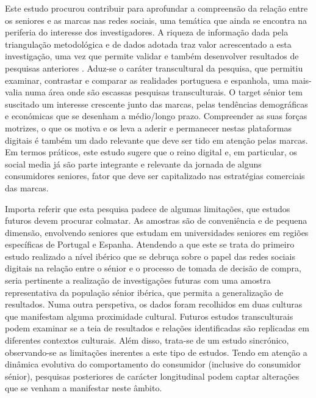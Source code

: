 \documentclass[portuguese]{textolivre}
\begin{document}
Este estudo procurou contribuir para aprofundar a compreensão da relação entre os seniores e as marcas nas redes sociais, uma temática que ainda se encontra na periferia do interesse dos investigadores. A riqueza de informação dada pela triangulação metodológica e de dados adotada traz valor acrescentado a esta investigação, uma vez que permite validar e também desenvolver resultados de pesquisas anteriores \cite{denzin1978}. Aduz-se o caráter transcultural da pesquisa, que permitiu examinar, contrastar e comparar as realidades portuguesa e espanhola, uma mais-valia numa área onde são escassas pesquisas transculturais. O target sénior tem suscitado um interesse crescente junto das marcas, pelas tendências demográficas e económicas que se desenham a médio/longo prazo. Compreender as suas forças motrizes, o que os motiva e os leva a aderir e permanecer nestas plataformas digitais é também um dado relevante que deve ser tido em atenção pelas marcas. Em termos práticos, este estudo sugere que o reino digital e, em particular, os social media já são parte integrante e relevante da jornada de alguns consumidores seniores, fator que deve ser capitalizado nas estratégias comerciais das marcas.

Importa referir que esta pesquisa padece de algumas limitações, que estudos futuros devem procurar colmatar. As amostras são de conveniência e de pequena dimensão, envolvendo seniores que estudam em universidades seniores em regiões específicas de Portugal e Espanha. Atendendo a que este se trata do primeiro estudo realizado a nível ibérico que se debruça sobre o papel das redes sociais digitais na relação entre o sénior e o processo de tomada de decisão de compra, seria pertinente a realização de investigações futuras com uma amostra representativa da população sénior ibérica, que permita a generalização de resultados. Numa outra perspetiva, os dados foram recolhidos em duas culturas que manifestam alguma proximidade cultural. Futuros estudos transculturais podem examinar se a teia de resultados e relações identificadas são replicadas em diferentes contextos culturais. Além disso, trata-se de um estudo sincrónico, observando-se as limitações inerentes a este tipo de estudos. Tendo em atenção a dinâmica evolutiva do comportamento do consumidor (inclusive do consumidor sénior), pesquisas posteriores de carácter longitudinal podem captar alterações que se venham a manifestar neste âmbito.

\printbibliography\label{sec-bib}
\end{document}
